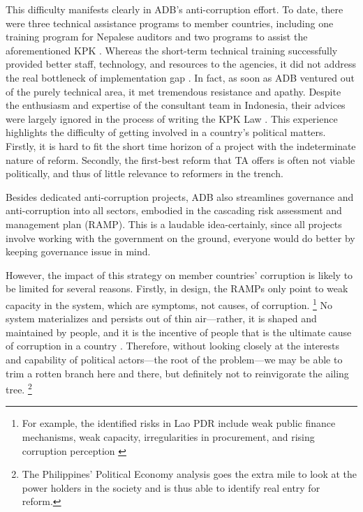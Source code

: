 \documentclass[12pt]{article}
\begin{document}
This difficulty manifests clearly in ADB's anti-corruption effort. To date, there were three technical assistance programs to member countries, including one training program for Nepalese auditors and two programs to assist the aforementioned KPK \citep{ADB2003, ADB2005, ADB2011}. Whereas the short-term technical training successfully provided better staff, technology, and resources to the agencies, it did not address the real bottleneck of implementation gap \citep{GlobalIntegrity2012}. In fact, as soon as ADB ventured out of the purely technical area, it met tremendous resistance and apathy. Despite the enthusiasm and expertise of the consultant team in Indonesia, their advices were largely ignored in the process of writing the KPK Law \citep{ADB2003, Schutte2012}. This experience highlights the difficulty of getting involved in a country's political matters. Firstly, it is hard to fit the short time horizon of a project with the indeterminate nature of reform. Secondly, the first-best reform that TA offers is often not viable politically, and thus of little relevance to reformers in the trench.

Besides dedicated anti-corruption projects, ADB also streamlines governance and anti-corruption into all sectors, embodied in the cascading risk assessment and management plan (RAMP). This is a laudable idea-certainly, since all projects involve working with the government on the ground, everyone would do better by keeping governance issue in mind.

However, the impact of this strategy on member countries' corruption is likely to be limited for several reasons. Firstly, in design, the RAMPs only point to weak capacity in the system, which are symptoms, not causes, of corruption. \footnote{For example, the identified risks in Lao PDR include weak public finance mechanisms, weak capacity, irregularities in procurement, and rising corruption perception \citep{ADB2011a}} No system materializes and persists out of thin air---rather, it is shaped and maintained by people, and it is the incentive of people that is the ultimate cause of corruption in a country \citep[6]{ADB2013}. Therefore, without looking closely at the interests and capability of political actors---the root of the problem---we may be able to trim a rotten branch here and there, but definitely not to reinvigorate the ailing tree. \footnote{The Philippines' Political Economy analysis goes the extra mile to look at the power holders in the society and is thus able to identify real entry for reform.}
\end{document}

